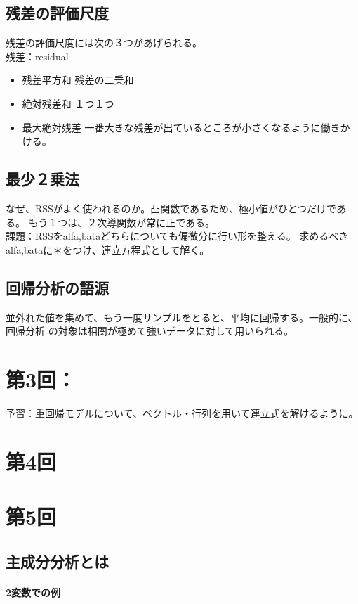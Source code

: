 \documentclass{jsarticle}
\begin{document}
\subsection{残差の評価尺度}
残差の評価尺度には次の３つがあげられる。\\
残差：residual
\begin{itemize}
  \item 残差平方和
  残差の二乗和
  \item 絶対残差和
  １つ１つ
  \item 最大絶対残差
  一番大きな残差が出ているところが小さくなるように働きかける。\\
\end{itemize}

\subsection{最少２乗法}
なぜ、RSSがよく使われるのか。凸関数であるため、極小値がひとつだけである。
もう１つは、２次導関数が常に正である。\\
課題：RSSをalfa,bataどちらについても偏微分に行い形を整える。
求めるべきalfa,bataに＊をつけ、連立方程式として解く。

\subsection{回帰分析の語源}
並外れた値を集めて、もう一度サンプルをとると、平均に回帰する。一般的に、回帰分析
の対象は相関が極めて強いデータに対して用いられる。

\section{第3回：}
予習：重回帰モデルについて、ベクトル・行列を用いて連立式を解けるように。

\section{第4回}
\section{第5回}
\subsection{主成分分析とは}
\paragraph{2変数での例}
\end{document}
